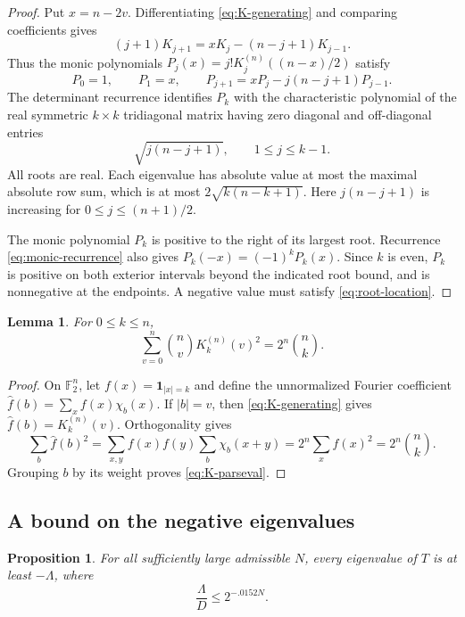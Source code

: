 \documentclass[11pt,leqno]{amsart}
\numberwithin{equation}{section}
\newtheorem{proposition}[theorem]{Proposition}
\newtheorem{lemma}[theorem]{Lemma}
\theoremstyle{definition}
\theoremstyle{remark}
\newcommand{\F}{\mathbb F}
\newcommand{\one}{\mathbf 1}
\newcommand{\abs}[1]{\lvert#1\rvert}
\begin{document}
\begin{proof}
Put $x=n-2v$. Differentiating \eqref{eq:K-generating} and comparing coefficients gives
\[
 (j+1)K_{j+1}=xK_j-(n-j+1)K_{j-1}.
\]
Thus the monic polynomials $P_j(x)=j!K_j^{(n)}((n-x)/2)$ satisfy
\begin{equation}\label{eq:monic-recurrence}
 P_0=1,\qquad P_1=x,\qquad
 P_{j+1}=xP_j-j(n-j+1)P_{j-1}.
\end{equation}
The determinant recurrence identifies $P_k$ with the characteristic polynomial of the real symmetric $k\times k$ tridiagonal matrix having zero diagonal and off-diagonal entries
\[
 \sqrt{j(n-j+1)},\qquad 1\le j\le k-1.
\]
All roots are real. Each eigenvalue has absolute value at most the maximal absolute row sum, which is at most $2\sqrt{k(n-k+1)}$. Here $j(n-j+1)$ is increasing for $0\le j\le(n+1)/2$.

The monic polynomial $P_k$ is positive to the right of its largest root. Recurrence \eqref{eq:monic-recurrence} also gives $P_k(-x)=(-1)^kP_k(x)$. Since $k$ is even, $P_k$ is positive on both exterior intervals beyond the indicated root bound, and is nonnegative at the endpoints. A negative value must satisfy \eqref{eq:root-location}.
\end{proof}

\begin{lemma}\label{lem:K-parseval}
For $0\le k\le n$,
\begin{equation}\label{eq:K-parseval}
 \sum_{v=0}^n\binom nv K_k^{(n)}(v)^2=2^n\binom nk.
\end{equation}
\end{lemma}

\begin{proof}
On $\F_2^n$, let $f(x)=\one_{\abs{x}=k}$ and define the unnormalized Fourier coefficient $\widehat f(b)=\sum_x f(x)\chi_b(x)$. If $\abs b=v$, then \eqref{eq:K-generating} gives $\widehat f(b)=K_k^{(n)}(v)$. Orthogonality gives
\[
 \sum_b\widehat f(b)^2
 =\sum_{x,y}f(x)f(y)\sum_b\chi_b(x+y)
 =2^n\sum_x f(x)^2
 =2^n\binom nk.
\]
Grouping $b$ by its weight proves \eqref{eq:K-parseval}.
\end{proof}

\subsection{A bound on the negative eigenvalues}

\begin{proposition}\label{prop:negative-spectrum}
For all sufficiently large admissible $N$, every eigenvalue of $T$ is at least $-\Lambda$, where
\begin{equation}\label{eq:spectral-decay}
 \frac{\Lambda}{D}\le2^{-.0152N}.
\end{equation}
\end{proposition}
\end{document}
